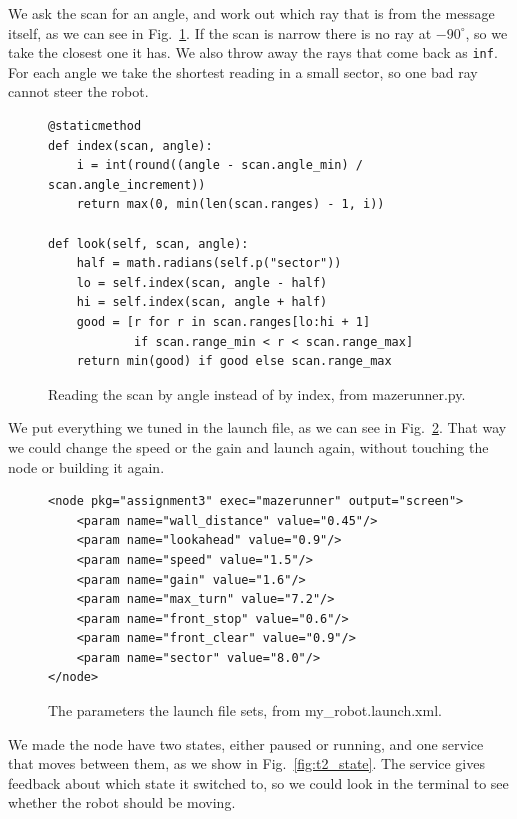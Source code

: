 \documentclass[conference]{IEEEtran}
\begin{document}
We ask the scan for an angle, and work out which ray that is from the message
itself, as we can see in Fig.~\ref{lst:t2_scan}. If the scan is narrow there is
no ray at $-90^\circ$, so we take the closest one it has. We also throw away
the rays that come back as \texttt{inf}. For each angle we take the shortest
reading in a small sector, so one bad ray cannot steer the robot.

\begin{figure}[H]
\begin{verbatim}
@staticmethod
def index(scan, angle):
    i = int(round((angle - scan.angle_min) / scan.angle_increment))
    return max(0, min(len(scan.ranges) - 1, i))

def look(self, scan, angle):
    half = math.radians(self.p("sector"))
    lo = self.index(scan, angle - half)
    hi = self.index(scan, angle + half)
    good = [r for r in scan.ranges[lo:hi + 1]
            if scan.range_min < r < scan.range_max]
    return min(good) if good else scan.range_max
\end{verbatim}
\caption{Reading the scan by angle instead of by index, from
         mazerunner.py.}
\label{lst:t2_scan}
\end{figure}

We put everything we tuned in the launch file, as we can see in
Fig.~\ref{lst:t2_params}. That way we could change the speed or the gain and
launch again, without touching the node or building it again.

\begin{figure}[H]
\begin{verbatim}
<node pkg="assignment3" exec="mazerunner" output="screen">
    <param name="wall_distance" value="0.45"/>
    <param name="lookahead" value="0.9"/>
    <param name="speed" value="1.5"/>
    <param name="gain" value="1.6"/>
    <param name="max_turn" value="7.2"/>
    <param name="front_stop" value="0.6"/>
    <param name="front_clear" value="0.9"/>
    <param name="sector" value="8.0"/>
</node>
\end{verbatim}
\caption{The parameters the launch file sets, from my\_robot.launch.xml.}
\label{lst:t2_params}
\end{figure}

We made the node have two states, either paused or running, and one service
that moves between them, as we show in Fig.~\ref{fig:t2_state}. The service
gives feedback about which state it switched to, so we could look in the
terminal to see whether the robot should be moving.
\end{document}
